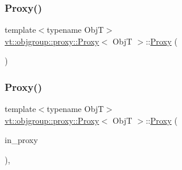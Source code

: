 \mbox{\label{structvt_1_1objgroup_1_1proxy_1_1_proxy_a8711a58bb0444c24553527b6ed9d0cfb}} 
\subsubsection{\texorpdfstring{Proxy()}{Proxy()}\hspace{0.1cm}{\footnotesize\ttfamily [3/4]}}
{\footnotesize\ttfamily template$<$typename ObjT$>$ \\
\hyperlink{structvt_1_1objgroup_1_1proxy_1_1_proxy}{vt\+::objgroup\+::proxy\+::\+Proxy}$<$ ObjT $>$\+::\hyperlink{structvt_1_1objgroup_1_1proxy_1_1_proxy}{Proxy} (\begin{DoxyParamCaption}\item[{\hyperlink{structvt_1_1objgroup_1_1proxy_1_1_proxy}{Proxy}$<$ ObjT $>$ \&\&}]{ }\end{DoxyParamCaption})\hspace{0.3cm}{\ttfamily [default]}}

\mbox{\label{structvt_1_1objgroup_1_1proxy_1_1_proxy_ab76d59446c73ebf1cea9c80fd70fbd6b}} 
\subsubsection{\texorpdfstring{Proxy()}{Proxy()}\hspace{0.1cm}{\footnotesize\ttfamily [4/4]}}
{\footnotesize\ttfamily template$<$typename ObjT$>$ \\
\hyperlink{structvt_1_1objgroup_1_1proxy_1_1_proxy}{vt\+::objgroup\+::proxy\+::\+Proxy}$<$ ObjT $>$\+::\hyperlink{structvt_1_1objgroup_1_1proxy_1_1_proxy}{Proxy} (\begin{DoxyParamCaption}\item[{\hyperlink{namespacevt_ad7cae989df485fccca57f0792a880a8e}{Obj\+Group\+Proxy\+Type}}]{in\+\_\+proxy }\end{DoxyParamCaption})\hspace{0.3cm}{\ttfamily [inline]}, {\ttfamily [explicit]}}



